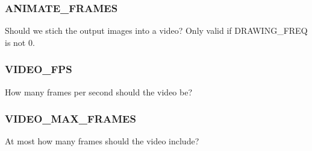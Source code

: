 \subsubsection{ANIMATE\_FRAMES}


Should we stich the output images into a video? Only valid if DRAWING\_FREQ is not 0.

\subsubsection{VIDEO\_FPS}


How many frames per second should the video be?

\subsubsection{VIDEO\_MAX\_FRAMES}


At most how many frames should the video include?
